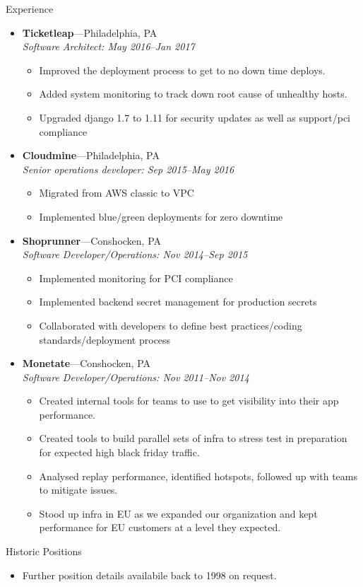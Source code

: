 \documentclass[11pt,oneside]{article}
\newenvironment{ressection}[1]{
        \vspace{4pt}
        {\fontfamily{phv}\selectfont\Large#1}
        \begin{itemize}
        \vspace{3pt}
}{
        \end{itemize}
}
\newcommand{\resitem}[1]{
        \vspace{-4pt}
        \item \begin{flushleft} #1 \end{flushleft}
}
\newcommand{\ressubitem}[1]{
        \vspace{-1pt}
        \item \begin{flushleft} #1 \end{flushleft}
}
\newcommand{\resbigitem}[3]{
        \vspace{-5pt}
        \item
        \textbf{#1}---#2 \\
        \textit{#3}
}
\newenvironment{ressubsec}[3]{
        \resbigitem{#1}{#2}{#3}
        \vspace{-2pt}
        \begin{itemize}
}{
        \end{itemize}
}
\begin{document}
\begin{ressection}{Experience}
        \begin{ressubsec}{Ticketleap}{Philadelphia, PA}{Software Architect: May 2016--Jan 2017}
          \ressubitem{Improved the deployment process to get to no down time deploys. }
          \ressubitem{Added system monitoring to track down root cause of unhealthy hosts.}
          \ressubitem{Upgraded django 1.7 to 1.11 for security updates as well as support/pci compliance }
        \end{ressubsec}
  
        \begin{ressubsec}{Cloudmine}{Philadelphia, PA}{Senior operations developer: Sep 2015--May 2016}

          \ressubitem{Migrated from AWS classic to VPC }
          \ressubitem{Implemented blue/green deployments for zero downtime }
        \end{ressubsec}
        
        \begin{ressubsec}{Shoprunner}{Conshocken, PA}{Software Developer/Operations: Nov 2014--Sep 2015}

          \ressubitem{Implemented monitoring for PCI compliance }
          \ressubitem{Implemented backend secret management for production secrets }
          \ressubitem{Collaborated with developers to define best practices/coding standards/deployment process}

        \end{ressubsec}
        

        
        \begin{ressubsec}{Monetate}{Conshocken, PA}{Software Developer/Operations: Nov 2011--Nov 2014}

          \ressubitem{Created internal tools for teams to use to get visibility into their app performance. }
          \ressubitem{Created tools to build parallel sets of infra to stress test in preparation for expected high black friday traffic.}
          \ressubitem{Analysed replay performance, identified hotspots, followed up with teams to mitigate issues.}
          \ressubitem{Stood up infra in EU as we expanded our organization and kept performance for EU customers at a level they expected.}
        \end{ressubsec}


\end{ressection}
\begin{ressection}{Historic Positions}
  \resitem{Further position details availabile back to 1998 on request.}

\end{ressection}
\end{document}
